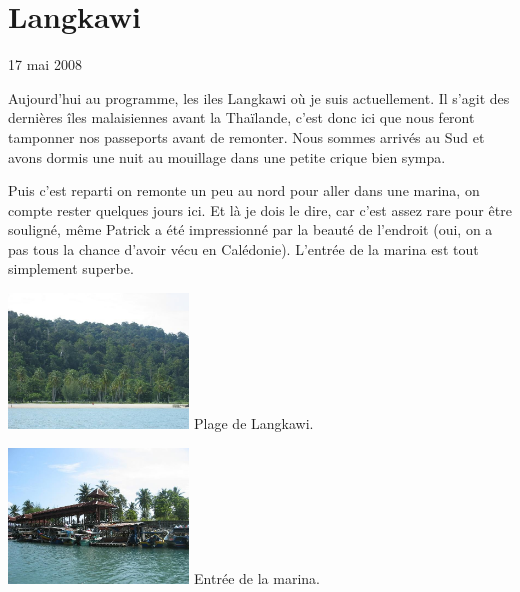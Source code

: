 \section{Langkawi}

17 mai 2008

\begin{multicols}{2}

Aujourd'hui au programme, les iles Langkawi où je suis actuellement. Il s'agit des dernières îles malaisiennes avant la Thaïlande, c'est donc ici que nous feront tamponner nos passeports avant de remonter. Nous sommes arrivés au Sud et avons dormis une nuit au mouillage dans une petite crique bien sympa.


Puis c'est reparti on remonte un peu au nord pour aller dans une marina, on compte rester quelques jours ici. Et là je dois le dire, car c'est assez rare pour être souligné, même Patrick a été impressionné par la beauté de l'endroit (oui, on a pas tous la chance d'avoir vécu en Calédonie). L'entrée de la marina est tout simplement superbe.

\hspace*{-0.65cm}
\includegraphics[width=4.8cm]{articles/langkawi/1211018197eneE.jpg}
Plage de Langkawi.

\hspace*{-0.65cm}
\includegraphics[width=4.8cm]{articles/langkawi/1211018204F7Ee.jpg}
Entrée de la marina.


\end{multicols}
